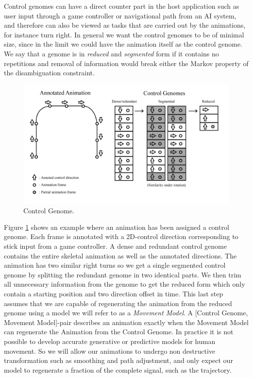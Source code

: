 Control genomes can have a direct counter part in the host application such as user input through a game controller or navigational path from an AI system, and therefore can also be viewed as tasks that are carried out by the animations, for instance turn right. In general we want the control genomes to be of minimal size, since in the limit we could have the animation itself as the control genome. We say that a genome is in \textit{reduced} and \textit{segmented} form if it contains no repetitions and removal of information would break either the Markov property of the disambiguation constraint. 

\begin{figure}
    \centering
    \includegraphics[width=1\columnwidth]{img/controlgenome.png}
    \caption{Control Genome.}
    \label{fig:control:genome}
\end{figure}

Figure \ref{fig:control:genome} shows an example where an animation has been assigned a control genome. Each frame is annotated with a 2D-control direction corresponding to stick input from a game controller. A dense and redundant control genome contains the entire skeletal animation as well as the annotated directions. The animation has two similar right turns so we get a single segmented control genome by splitting the redundant genome in two identical parts. We then trim all unnecessary information from the genome to get the reduced form which only contain a starting position and two direction offset in time. This last step assumes that we are capable of regenerating the animation from the reduced genome using a model we will refer to as a \textit{Movement Model}. A [Control Genome, Movement Model]-pair describes an animation exactly when the Movement Model can regenerate the Animation from the Control Genome.  In practice it is not possible to develop accurate generative or predictive models for human movement. So we will allow our animations to undergo non destructive transformation such as smoothing and path adjustment, and only expect our model to regenerate a fraction of the complete signal, such as the trajectory. 

